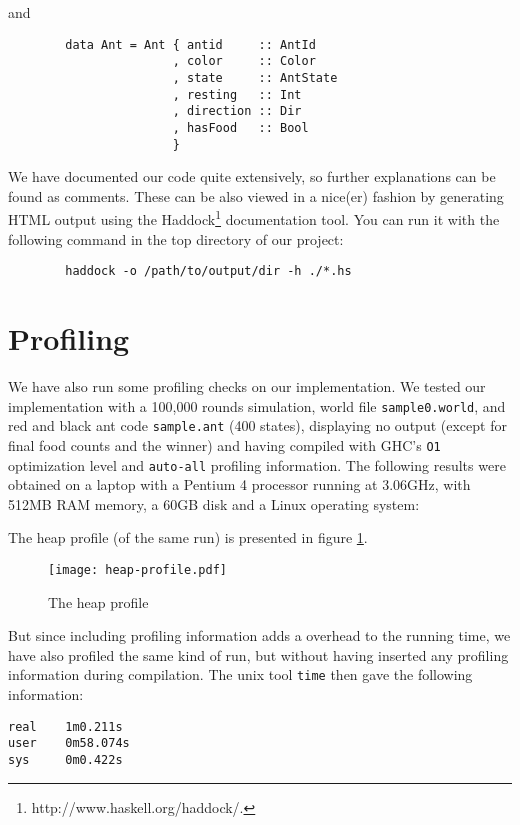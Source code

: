 \documentclass[a4paper,10pt]{article}
\begin{document}
and

\begin{verbatim}
        data Ant = Ant { antid     :: AntId
                       , color     :: Color
                       , state     :: AntState
                       , resting   :: Int
                       , direction :: Dir
                       , hasFood   :: Bool
                       }
\end{verbatim}

We have documented our code quite extensively, so further explanations can be found as
comments. These can be also viewed in a nice(er) fashion by generating HTML output using the
Haddock\footnote[2]{http://www.haskell.org/haddock/.} documentation tool. You can run
it with the following command in the top directory of our project:

\begin{verbatim}
        haddock -o /path/to/output/dir -h ./*.hs
\end{verbatim}

\section{Profiling}

We have also run some profiling checks on our implementation. We
tested our implementation with a 100,000 rounds simulation, world
file {\tt sample0.world}, and red and black ant code {\tt sample.ant} (400
states), displaying no output (except for final food counts and the
winner) and having compiled with GHC's {\tt O1} optimization level and
{\tt auto-all} profiling information. The following results were obtained
on a laptop with a Pentium 4 processor running at 3.06GHz, with
512MB RAM memory, a 60GB disk and a Linux operating system:



The heap profile (of the same run) is presented in figure \ref{heap}.

\begin{figure}
\label{heap}
\texttt{[image: heap-profile.pdf]}
\caption{The heap profile}
\end{figure}

But since including profiling information adds a overhead to the
running time, we have also profiled the same kind of run, but
without having inserted any profiling information during
compilation. The unix tool {\tt time} then gave the following
information:
\begin{verbatim}
real    1m0.211s
user    0m58.074s
sys     0m0.422s
\end{verbatim}
\end{document}

